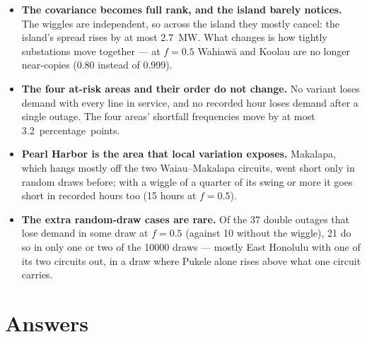 \documentclass[11pt,a4paper]{article}
\begin{document}
\begin{itemize}
  \item \textbf{The covariance becomes full rank, and the island barely notices.} The
        wiggles are independent, so across the island they mostly cancel: the island's
        spread rises by at most \SI{2.7}{MW}. What changes is how tightly substations
        move together --- at $f = 0.5$ Wahiaw\=a and Koolau are no longer near-copies
        (0.80 instead of 0.999).
  \item \textbf{The four at-risk areas and their order do not change.} No variant loses
        demand with every line in service, and no recorded hour loses demand after a
        single outage. The four areas' shortfall frequencies move by at most
        \SI{3.2}{percentage points}.
  \item \textbf{Pearl Harbor is the area that local variation exposes.} Makalapa, which
        hangs mostly off the two Waiau--Makalapa circuits, went short only in random
        draws before; with a wiggle of a quarter of its swing or more it goes short in
        recorded hours too (15 hours at $f = 0.5$).
  \item \textbf{The extra random-draw cases are rare.} Of the 37 double outages that
        lose demand in some draw at $f = 0.5$ (against 10 without the wiggle), 21 do so
        in only one or two of the \num{10000} draws --- mostly East Honolulu with one of
        its two circuits out, in a draw where Pukele alone rises above what one circuit
        carries.
\end{itemize}

\section{Answers}
\label{sec:answers}
\end{document}

